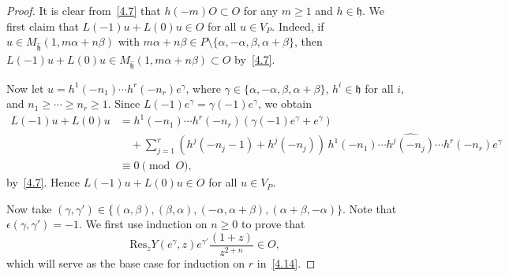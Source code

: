 \documentclass[10pt,a4paper]{amsart}
\def \al{\alpha}
\def \b {\beta}
\def \ga {\gamma}
\def \h {\mathfrak{h}}
\def\Res{\mathrm{Res}}
\begin{document}
	\begin{proof}
		It is clear from~\eqref{4.7} that $h(-m)O\subset O$ for any $m\geq 1$ and $h\in\h$.  
		We first claim that $L(-1)u+L(0)u\in O$ for all $u\in V_P$.  
		Indeed, if $u\in M_{\hat{\h}}(1,m\al+n\b)$ with $m\al+n\b\in P\setminus\{\al,-\al,\b,\al+\b\}$,  
		then $L(-1)u+L(0)u\in M_{\hat{\h}}(1,m\al+n\b)\subset O$ by~\eqref{4.7}.  
		
		Now let $u=h^1(-n_1)\cdots h^r(-n_r)e^\ga$, where $\ga\in\{\al,-\al,\b,\al+\b\}$,  
		$h^i\in\h$ for all $i$, and $n_1\geq\cdots\geq n_r\geq 1$.  
		Since $L(-1)e^\ga=\ga(-1)e^\ga$, we obtain
		\begin{align*}
			L(-1)u+L(0)u
			&=h^1(-n_1)\cdots h^r(-n_r)(\ga(-1)e^\ga+e^\ga)\\
			&\quad+\sum_{j=1}^r (h^j(-n_j-1)+h^j(-n_j))\,h^1(-n_1)\cdots \widehat{h^j(-n_j)}\cdots h^r(-n_r)e^\ga\\
			&\equiv 0\pmod{O},
		\end{align*}
		by~\eqref{4.7}. Hence $L(-1)u+L(0)u\in O$ for all $u\in V_P$.
		
		Now take $(\ga,\ga')\in\{(\al,\b),(\b,\al),(-\al,\al+\b),(\al+\b,-\al)\}$.  
		Note that $\epsilon(\ga,\ga')=-1$.
		We first use induction on $n\geq 0$ to prove that
		\begin{equation}\label{4.15}
			\Res_z Y(e^{\ga},z)e^{\ga'}\frac{(1+z)}{z^{2+n}}\in O,
		\end{equation}
		which will serve as the base case for induction on $r$ in~\eqref{4.14}.
		

\end{proof}
\end{document}
